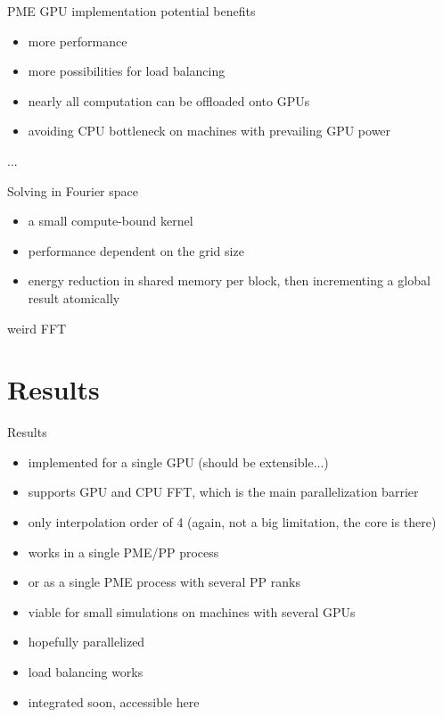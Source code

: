 \documentclass[11pt]{beamer}
\begin{document}
\begin{frame}{PME GPU implementation potential benefits}
\begin{itemize}
\item more performance
\item more possibilities for load balancing
\item nearly all computation can be offloaded onto GPUs
\item avoiding CPU bottleneck on machines with prevailing GPU power  
\end{itemize}
\end{frame}

\begin{frame}{...}
\end{frame}


\begin{frame}{Solving in Fourier space}
\begin{itemize}
\item a small compute-bound kernel
\item performance dependent on the grid size
\item energy reduction in shared memory per block, then incrementing a global result atomically
\end{itemize}
\end{frame}


\begin{frame}{weird FFT}
\end{frame}

\section{Results}
\begin{frame}{Results}
\begin{itemize}
\item implemented for a single GPU (should be extensible...)
\item supports GPU and CPU FFT, which is the main parallelization barrier 
\item only interpolation order of 4 (again, not a big limitation, the core is there)
\item works in a single PME/PP process
\item or as a single PME process with several PP ranks
\item viable for small simulations on machines with several GPUs
\item hopefully parallelized
\item load balancing works
\item integrated soon, accessible here
\end{itemize}
\end{frame}
\end{document}
